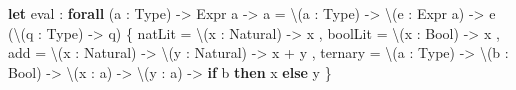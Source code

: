 \documentclass[]{article}
\newenvironment{Shaded}{}{}
\newcommand{\CommentTok}[1]{\textcolor[rgb]{0.38,0.63,0.69}{\textit{#1}}}
\newcommand{\KeywordTok}[1]{\textcolor[rgb]{0.00,0.44,0.13}{\textbf{#1}}}
\newcommand{\NormalTok}[1]{#1}
\newcommand{\OperatorTok}[1]{\textcolor[rgb]{0.40,0.40,0.40}{#1}}
\begin{document}
\begin{Shaded}
\begin{Highlighting}[]
\KeywordTok{let}\CommentTok{ }\NormalTok{eval}
\CommentTok{    }\NormalTok{:}\CommentTok{ }\KeywordTok{forall}\CommentTok{ }\NormalTok{(a}\CommentTok{ }\NormalTok{:}\CommentTok{ }\NormalTok{Type)}\CommentTok{ }\OperatorTok{{-}\textgreater{}}\CommentTok{ }\NormalTok{Expr}\CommentTok{ }\NormalTok{a}\CommentTok{ }\OperatorTok{{-}\textgreater{}}\CommentTok{ }\NormalTok{a}
\CommentTok{    }\NormalTok{=}\CommentTok{ }\OperatorTok{\textbackslash{}}\NormalTok{(a}\CommentTok{ }\NormalTok{:}\CommentTok{ }\NormalTok{Type)}\CommentTok{ }\OperatorTok{{-}\textgreater{}}
\CommentTok{      }\OperatorTok{\textbackslash{}}\NormalTok{(e}\CommentTok{ }\NormalTok{:}\CommentTok{ }\NormalTok{Expr}\CommentTok{ }\NormalTok{a)}\CommentTok{ }\OperatorTok{{-}\textgreater{}}
\CommentTok{        }\NormalTok{e}
\CommentTok{          }\NormalTok{(}\OperatorTok{\textbackslash{}}\NormalTok{(q}\CommentTok{ }\NormalTok{:}\CommentTok{ }\NormalTok{Type)}\CommentTok{ }\OperatorTok{{-}\textgreater{}}\CommentTok{ }\NormalTok{q)}
\CommentTok{          }\NormalTok{\{}\CommentTok{ }\NormalTok{natLit}\CommentTok{ }\NormalTok{=}\CommentTok{ }\OperatorTok{\textbackslash{}}\NormalTok{(x}\CommentTok{ }\NormalTok{:}\CommentTok{ }\NormalTok{Natural)}\CommentTok{ }\OperatorTok{{-}\textgreater{}}\CommentTok{ }\NormalTok{x}
\CommentTok{          }\NormalTok{,}\CommentTok{ }\NormalTok{boolLit}\CommentTok{ }\NormalTok{=}\CommentTok{ }\OperatorTok{\textbackslash{}}\NormalTok{(x}\CommentTok{ }\NormalTok{:}\CommentTok{ }\NormalTok{Bool)}\CommentTok{ }\OperatorTok{{-}\textgreater{}}\CommentTok{ }\NormalTok{x}
\CommentTok{          }\NormalTok{,}\CommentTok{ }\NormalTok{add}\CommentTok{ }\NormalTok{=}\CommentTok{ }\OperatorTok{\textbackslash{}}\NormalTok{(x}\CommentTok{ }\NormalTok{:}\CommentTok{ }\NormalTok{Natural)}\CommentTok{ }\OperatorTok{{-}\textgreater{}}\CommentTok{ }\OperatorTok{\textbackslash{}}\NormalTok{(y}\CommentTok{ }\NormalTok{:}\CommentTok{ }\NormalTok{Natural)}\CommentTok{ }\OperatorTok{{-}\textgreater{}}\CommentTok{ }\NormalTok{x}\CommentTok{ }\NormalTok{+}\CommentTok{ }\NormalTok{y}
\CommentTok{          }\NormalTok{,}\CommentTok{ }\NormalTok{ternary}\CommentTok{ }\NormalTok{=}
\CommentTok{              }\OperatorTok{\textbackslash{}}\NormalTok{(a}\CommentTok{ }\NormalTok{:}\CommentTok{ }\NormalTok{Type)}\CommentTok{ }\OperatorTok{{-}\textgreater{}}
\CommentTok{              }\OperatorTok{\textbackslash{}}\NormalTok{(b}\CommentTok{ }\NormalTok{:}\CommentTok{ }\NormalTok{Bool)}\CommentTok{ }\OperatorTok{{-}\textgreater{}}
\CommentTok{              }\OperatorTok{\textbackslash{}}\NormalTok{(x}\CommentTok{ }\NormalTok{:}\CommentTok{ }\NormalTok{a)}\CommentTok{ }\OperatorTok{{-}\textgreater{}}
\CommentTok{              }\OperatorTok{\textbackslash{}}\NormalTok{(y}\CommentTok{ }\NormalTok{:}\CommentTok{ }\NormalTok{a)}\CommentTok{ }\OperatorTok{{-}\textgreater{}}
\CommentTok{                }\KeywordTok{if}\CommentTok{ }\NormalTok{b}\CommentTok{ }\KeywordTok{then}\CommentTok{ }\NormalTok{x}\CommentTok{ }\KeywordTok{else}\CommentTok{ }\NormalTok{y}
\CommentTok{          }\NormalTok{\}}
\end{Highlighting}
\end{Shaded}
\end{document}
